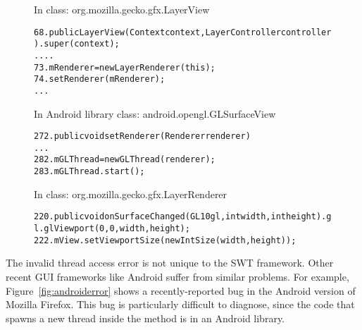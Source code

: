 \begin{figure}[t]
\hspace{6mm}\small{In class: org.mozilla.gecko.gfx.LayerView}
\vspace{-2mm}
\begin{CodeOut}
\begin{alltt}
68.  public LayerView(Context context, LayerController controller) .     super(context);
        ....
73.     mRenderer = new LayerRenderer(this);
74.     setRenderer(mRenderer);
        ...
     \ttrcb
\end{alltt}
\end{CodeOut}
\hspace{6mm} \small{In Android library class: android.opengl.GLSurfaceView}
\vspace{-2mm}
\begin{CodeOut}
\begin{alltt}
272. public void setRenderer(Renderer renderer) \ttlcb
        ...
282.    mGLThread = new GLThread(renderer);
283.    mGLThread.start();   
     \ttrcb
\end{alltt}
\end{CodeOut}
 \hspace{6mm}\small{In class: org.mozilla.gecko.gfx.LayerRenderer}
\vspace{-2mm}
\begin{CodeOut}
\begin{alltt}
220. public void onSurfaceChanged(GL10 gl, int width, int height) .    gl.glViewport(0, 0, width, height);
222.    mView.setViewportSize(new IntSize(width, height));
     \ttrcb
\end{alltt}
\end{CodeOut}
\tinystep
\vspace*{-3.0ex}  %
\end{figure}

The invalid thread access error is not unique to the SWT framework. Other recent GUI frameworks
like Android suffer from similar problems. For example, 
Figure~\ref{fig:androiderror} shows a recently-reported bug in the Android version of Mozilla Firefox.
This bug is particularly difficult to diagnose, 
since the code that spawns a new thread inside the  method is
in an Android library.

